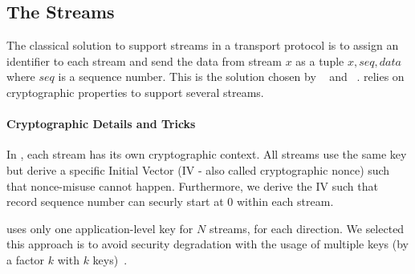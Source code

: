 
\subsection{The \tcpls Streams}\label{sec:datastreams}
The classical solution to support streams in a transport protocol is to assign an identifier to each stream and send the data from stream $x$ as a tuple $x,seq,data$ where $seq$ is a sequence number. This is the solution chosen by \sctp~\cite{rfc4960} and \quic~\cite{draft-ietf-quic-transport}. \tcpls relies on cryptographic properties to support several streams.

\paragraph*{Cryptographic Details and Tricks}
In \tcpls, each stream has its own cryptographic context. All streams use
the same key but derive a specific Initial Vector (IV - also called cryptographic nonce) such that nonce-misuse cannot happen. Furthermore, we derive the IV such that \tcpls record sequence number can securly start at $0$ within each stream.

\tcpls uses only one application-level key for $N$ streams, for each direction. We selected this approach is to avoid security degradation with the usage of multiple keys (by a factor $k$ with $k$ keys)~\cite{chatterjee2011another}.

